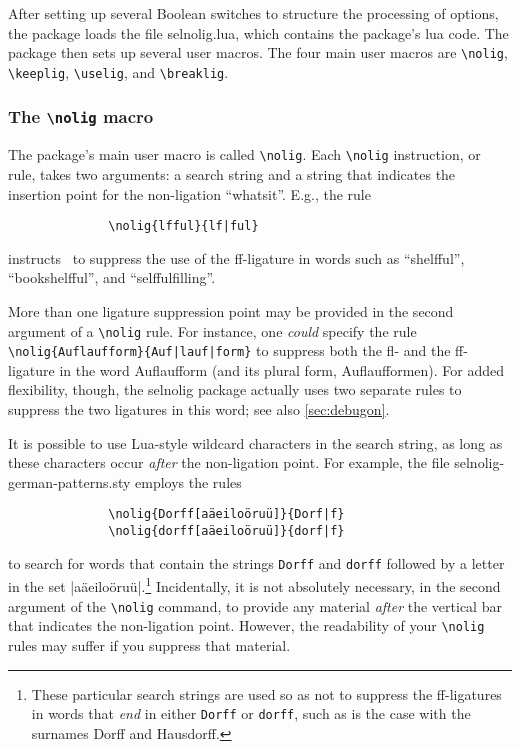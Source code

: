 \documentclass[11pt]{article}
\newcommand{\pkg}[1]{\textsf{#1}}
\newcommand{\opt}[1]{\texttt{#1}}
\newcommand{\cmmd}[1]{\texttt{\textbackslash #1}}
\begin{document}
After setting up several Boolean switches to structure the processing of options, the package loads the file \pkg{selnolig.lua}, which contains the package's lua code. The package then sets up several user macros. The four main user macros are \cmmd{nolig}, \cmmd{keeplig}, \cmmd{uselig}, and \cmmd{breaklig}.



\subsubsection{The \cmmd{nolig} macro}
\label{sec:nolig}


The package's main user macro is called \cmmd{nolig}. Each \cmmd{nolig} instruction, or rule, takes two arguments: a search string and a string that indicates the insertion point for the non-ligation \enquote{whatsit}. E.g., the rule
\begin{Verbatim}
              \nolig{lfful}{lf|ful}
\end{Verbatim}
instructs \LuaLaTeX\ to suppress the use of the ff-ligature in words such as \enquote{shelfful}, \enquote{bookshelfful}, and \enquote{selffulfilling}. 

More than one ligature suppression point may be provided in the second argument of a \cmmd{nolig} rule. For instance, one \emph{could} specify the rule \Verb+\nolig{Auflaufform}{Auf|lauf|form}+ to suppress both the fl- and the ff-ligature in the word Auflaufform (and its plural form, Auflaufformen). For added flexibility, though, the \pkg{selnolig} package actually uses two separate rules to suppress the two ligatures in this word; see also \cref{sec:debugon}.


It is possible to use Lua-style wildcard characters in the search string, as long as these characters occur \emph{after} the non-ligation point. For example, the file \pkg{selnolig-german-patterns.sty} employs the rules 
\begin{Verbatim}
              \nolig{Dorff[aäeiloöruü]}{Dorf|f}
              \nolig{dorff[aäeiloöruü]}{dorf|f}
\end{Verbatim}
to search for words that contain the strings \opt{Dorff} and \opt{dorff} followed by a letter in the set |aäeiloöruü|.\footnote{These particular search strings are used so as not to suppress the ff-ligatures in words that \emph{end} in either \opt{Dorff} or \opt{dorff}, such as is the case with the surnames Dorff and Hausdorff.} Incidentally, it is not absolutely necessary, in the second argument of the \cmmd{nolig} command, to provide any material \emph{after} the vertical bar that indicates the non-ligation point. However, the readability of your \cmmd{nolig} rules may suffer if you suppress that material.
\end{document}
